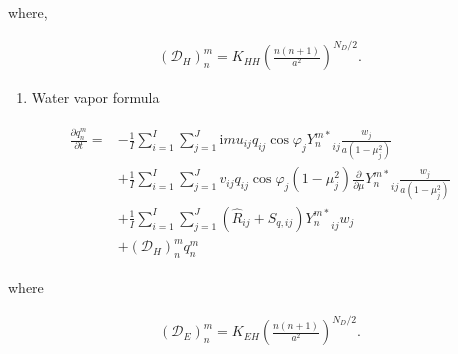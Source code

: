 where,

\begin{eqnarray}
({\mathcal D}_H)_n^m
   =  K_{HH} \left( \frac{n(n+1)}{a^{2}} \right)^{N_D/2} .
\end{eqnarray}

\begin{enumerate}
\def\labelenumi{\arabic{enumi}.}
\setcounter{enumi}{3}
\tightlist
\item
  Water vapor formula
\end{enumerate}

\begin{eqnarray}
\begin{aligned}
  \frac{\partial{q_n^m}}{\partial {t}}
   =  & - \frac{1}{I} \sum_{i=1}^{I} \sum_{j=1}^{J}
          \mathrm{i}m u_{ij} q_{ij} \cos\varphi_j
          {Y_n^{m *}}_{ij} \frac{w_j}{a(1-\mu_j^{2})} \\
    & + \frac{1}{I} \sum_{i=1}^{I} \sum_{j=1}^{J}
          v_{ij} q_{ij} \cos\varphi_j
          (1-\mu_j^2)
          \frac{\partial }{\partial \mu} {Y_n^{m *}}_{ij}
          \frac{w_j}{a(1-\mu_j^{2})}\\
    & + \frac{1}{I} \sum_{i=1}^{I} \sum_{j=1}^{J}
          \left( \hat{R}_{ij} + S_{q,ij} \right)
          {Y_n^{m *}}_{ij} w_j \\
    & + ({\mathcal D}_H)_n^m q_n^m
\end{aligned}
\end{eqnarray}

where

\begin{eqnarray}
({\mathcal D}_E)_n^m
   =  K_{EH} \left( \frac{n(n+1)}{a^{2}} \right)^{N_D/2} .
\end{eqnarray}
